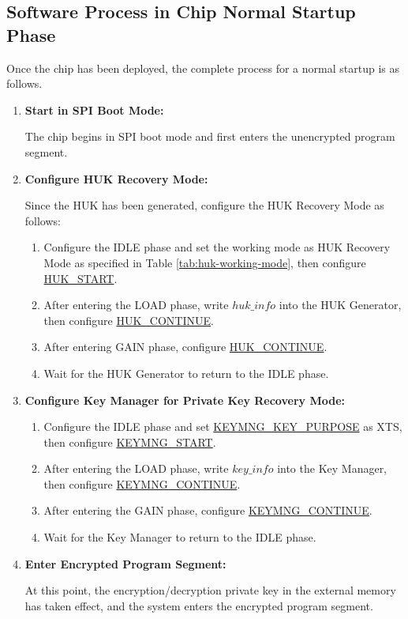 \documentclass[main\_\_EN.tex]{subfiles}
\begin{document}
\subsection{Software Process in Chip Normal Startup Phase}
Once the chip has been deployed, the complete process for a normal startup is as follows.
\begin{enumerate}
    \item \textbf{Start in SPI Boot Mode:}

    The chip begins in SPI boot mode and first enters the unencrypted program segment.

    \item \textbf{Configure HUK Recovery Mode:}

    Since the HUK has been generated, configure the HUK Recovery Mode as follows:
    \begin{enumerate}
        \item Configure the IDLE phase and set the working mode as HUK Recovery Mode as specified in Table \ref{tab:huk-working-mode}, then configure \hyperref[fielddesc:HUKSTART]{HUK\_START}.
        \item After entering the LOAD phase, write \hyperref[para:hukinfo]{\begin{math}huk\_info\end{math}} into the HUK Generator, then configure \hyperref[fielddesc:HUKCONTINUE]{HUK\_CONTINUE}.
        \item After entering GAIN phase, configure \hyperref[fielddesc:HUKCONTINUE]{HUK\_CONTINUE}.
        \item Wait for the HUK Generator to return to the IDLE phase.
    \end{enumerate}
    \item \textbf{Configure Key Manager for Private Key Recovery Mode:}
    \begin{enumerate}
        \item Configure the IDLE phase and set \hyperref[fielddesc:KEYMNGKEYPURPOSE]{KEYMNG\_KEY\_PURPOSE} as XTS, then configure \hyperref[fielddesc:KEYMNGSTART]{KEYMNG\_START}.
        \item After entering the LOAD phase, write \hyperref[para:keyinfo]{\begin{math}key\_info\end{math}} into the Key Manager, then configure \hyperref[fielddesc:KEYMNGCONTINUE]{KEYMNG\_CONTINUE}.
        \item After entering the GAIN phase, configure \hyperref[fielddesc:KEYMNGCONTINUE]{KEYMNG\_CONTINUE}.
        \item Wait for the Key Manager to return to the IDLE phase.
    \end{enumerate}
    \item \textbf{Enter Encrypted Program Segment:}

    At this point, the encryption/decryption private key in the external memory has taken effect, and the system enters the encrypted program segment.
\end{enumerate}
\end{document}
